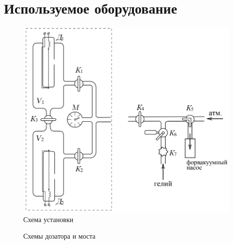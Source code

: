 \documentclass[1 pt]{article}
\begin{document}
\section{Используемое оборудование}
\begin{figure}[!ht]
\begin{center}
\includegraphics[scale=0.4]{physlabwork_6week_setup.png}\caption{Схема установки}\label{figure1}
\end{center}
\end{figure}
\begin{figure}%
    \centering
    \qquad
    \caption{Схемы дозатора и моста}%
    \label{}%
\end{figure}
\newpage
\end{document}
